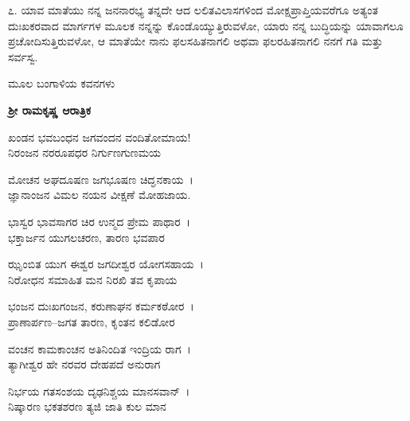 ೭. ಯಾವ ಮಾತೆಯು ನನ್ನ ಜನನಾರಭ್ಯ ತನ್ನದೇ ಆದ ಲಲಿತವಿಲಾಸಗಳಿಂದ ಮೋಕ್ಷಪ್ರಾಪ್ತಿಯವರೆಗೂ ಅತ್ಯಂತ ದುಃಖಕರವಾದ ಮಾರ್ಗಗಳ ಮೂಲಕ ನನ್ನನ್ನು ಕೊಂಡೊಯ್ಯುತ್ತಿರುವಳೋ, ಯಾರು ನನ್ನ ಬುದ್ಧಿಯನ್ನು ಯಾವಾಗಲೂ ಪ್ರಚೋದಿಸುತ್ತಿರುವಳೋ, ಆ ಮಾತೆಯೇ ನಾನು ಫಲಸಹಿತನಾಗಲಿ ಅಥವಾ ಫಲರಹಿತನಾಗಲಿ ನನಗೆ ಗತಿ ಮತ್ತು ಸರ್ವಸ್ವ.

ಮೂಲ ಬಂಗಾಳಿಯ ಕವನಗಳು

\begin{center}
\textbf{ಶ‍್ರೀ ರಾಮಕೃಷ್ಣ ಆರಾತ್ರಿಕ}
\end{center}

\begin{myquote}
ಖಂಡನ ಭವಬಂಧನ ಜಗವಂದನ ವಂದಿತೋಮಾಯ!\\ನಿರಂಜನ ನರರೂಪಧರ ನಿರ್ಗುಣಗುಣಮಯ
\end{myquote}


\begin{myquote}
ಮೋಚನ ಅಘದೂಷಣ ಜಗಭೂಷಣ ಚಿದ್ಘನಕಾಯ~।\\ಜ್ಞಾನಾಂಜನ ವಿಮಲ ನಯನ ವೀಕ್ಷಣೆ ಮೋಹಜಾಯ.
\end{myquote}


\begin{myquote}
ಭಾಸ್ವರ ಭಾವಸಾಗರ ಚಿರ ಉನ್ಮದ ಪ್ರೇಮ ಪಾಥಾರ~।\\ಭಕ್ತಾರ್ಜನ ಯುಗಲಚರಣ, ತಾರಣ ಭವಪಾರ
\end{myquote}


\begin{myquote}
ಝೃಂಬಿತ ಯುಗ ಈಶ್ವರ ಜಗದೀಶ್ವರ ಯೋಗಸಹಾಯ~।\\ನಿರೋಧನ ಸಮಾಹಿತ ಮನ ನಿರಖಿ ತವ ಕೃಪಾಯ
\end{myquote}


\begin{myquote}
ಭಂಜನ ದುಃಖಗಂಜನ, ಕರುಣಾಘನ ಕರ್ಮಕಠೋರ~।\\ಪ್ರಾಣಾರ್ಪಣ–ಜಗತ ತಾರಣ, ಕೃಂತನ ಕಲಿಡೋರ
\end{myquote}


\begin{myquote}
ವಂಚನ ಕಾಮಕಾಂಚನ ಅತಿನಿಂದಿತ ಇಂದ್ರಿಯ ರಾಗ~।\\ತ್ಯಾಗೀಶ್ವರ ಹೇ ನರವರ ದೇಹಪದೆ ಅನುರಾಗ
\end{myquote}


\begin{myquote}
ನಿರ್ಭಯ ಗತಸಂಶಯ ದೃಢನಿಶ್ಚಯ ಮಾನಸವಾನ್~।\\ನಿಷ್ಕಾರಣ ಭಕತಶರಣ ತ್ಯಜಿ ಜಾತಿ ಕುಲ ಮಾನ
\end{myquote}


